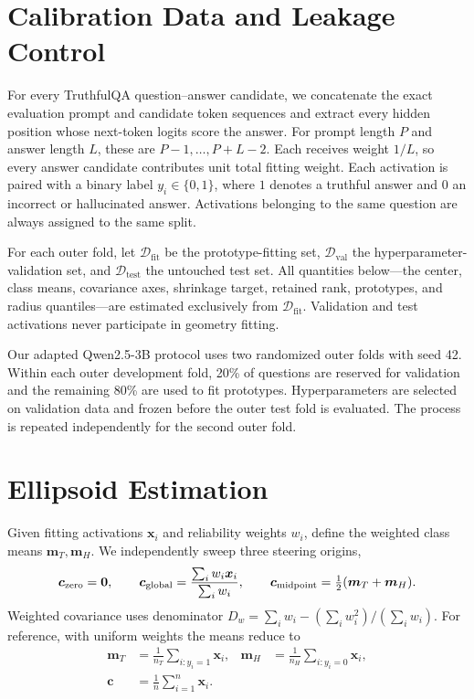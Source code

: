 \documentclass[11pt]{article}
\begin{document}
\section{Calibration Data and Leakage Control}

For every TruthfulQA question--answer candidate, we concatenate the exact
evaluation prompt and candidate token sequences and extract every hidden
position whose next-token logits score the answer. For prompt length $P$ and
answer length $L$, these are $P-1,\ldots,P+L-2$. Each receives weight $1/L$,
so every answer candidate contributes unit total fitting weight. Each
activation is paired with a binary label $y_i\in\{0,1\}$, where
$1$ denotes a truthful answer and $0$ an incorrect or hallucinated answer.
Activations belonging to the same question are always assigned to the same
split.

For each outer fold, let $\mathcal D_{\mathrm{fit}}$ be the prototype-fitting
set, $\mathcal D_{\mathrm{val}}$ the hyperparameter-validation set, and
$\mathcal D_{\mathrm{test}}$ the untouched test set.  All quantities below---the
center, class means, covariance axes, shrinkage target, retained rank,
prototypes, and radius quantiles---are estimated exclusively from
$\mathcal D_{\mathrm{fit}}$.  Validation and test activations never participate
in geometry fitting.

Our adapted Qwen2.5-3B protocol uses two randomized outer folds with seed 42.
Within each outer development fold, 20\% of questions are reserved for
validation and the remaining 80\% are used to fit prototypes.  Hyperparameters
are selected on validation data and frozen before the outer test fold is
evaluated.  The process is repeated independently for the second outer fold.

\section{Ellipsoid Estimation}

Given fitting activations $\bm x_i$ and reliability weights $w_i$, define the
weighted class means $\bm m_T,\bm m_H$. We independently sweep three steering
origins,
\begin{equation}
 \bm c_{\rm zero}=\bm0,\qquad
 \bm c_{\rm global}=\frac{\sum_iw_i\bm x_i}{\sum_iw_i},\qquad
 \bm c_{\rm midpoint}=\tfrac12(\bm m_T+\bm m_H).
\end{equation}
Weighted covariance uses denominator
$D_w=\sum_iw_i-(\sum_iw_i^2)/(\sum_iw_i)$. For reference, with uniform
weights the means reduce to
\begin{align}
  \bm m_T &= \frac{1}{n_T}\sum_{i:y_i=1}\bm x_i, &
  \bm m_H &= \frac{1}{n_H}\sum_{i:y_i=0}\bm x_i,\\
  \bm c &= \frac{1}{n}\sum_{i=1}^{n}\bm x_i.
\end{align}
\end{document}
